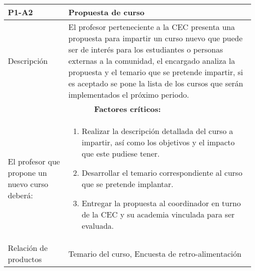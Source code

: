 \begin{table}[H]
	\centering
	\begin{tabular}{p{3.5cm} p{12.5cm}}
		\hline
		\rowcolor{LightBlue2} \textbf{P1-A2} & \textbf{Propuesta de curso}\\
		\hline\hline
		Descripción & El profesor perteneciente a la CEC presenta una propuesta para impartir un curso nuevo que puede ser de interés para los estudiantes o personas externas a la comunidad, el encargado analiza la propuesta y el temario que se pretende impartir, si es aceptado se pone la lista de los cursos que serán implementados el próximo periodo.\\			
		\hline	\hline		
			\multicolumn{2}{|c|}{\textbf{Factores críticos:}}\\
		\hline\hline
			{El profesor que propone un nuevo curso deberá:}&
			\begin{enumerate}
				\item Realizar la descripción detallada del curso a impartir, así como los objetivos y el impacto que este pudiese tener.
				\item Desarrollar el temario correspondiente al curso que se pretende implantar.
				\item Entregar la propuesta al coordinador en turno de la CEC y su academia vinculada para ser evaluada.
			\end{enumerate}\\
		\hline
		Relación de productos & Temario del curso, Encuesta de retro-alimentación\\
		\hline
	\end{tabular}
\end{table}



